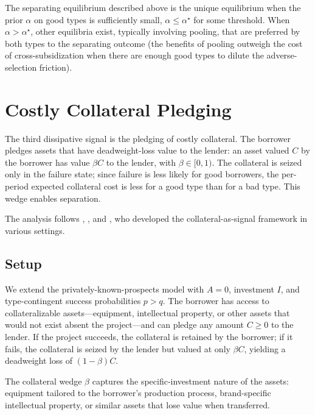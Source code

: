 \documentclass[11pt,a4paper,oneside]{book}
\def\leq{\leqslant}
\def\geq{\geqslant}
\theoremstyle{plain}
\theoremstyle{definition}
\theoremstyle{remark}
\numberwithin{equation}{chapter}
\begin{document}
The separating equilibrium described above is the unique equilibrium when the prior $\alpha$ on good types is sufficiently small, $\alpha \leq \alpha^\star$ for some threshold.
When $\alpha > \alpha^\star$, other equilibria exist, typically involving pooling, that are preferred by both types to the separating outcome (the benefits of pooling outweigh the cost of cross-subsidization when there are enough good types to dilute the adverse-selection friction).

\section{Costly Collateral Pledging}
\label{sec:diss-collateral}

The third dissipative signal is the pledging of costly collateral.
The borrower pledges assets that have deadweight-loss value to the lender: an asset valued $C$ by the borrower has value $\beta C$ to the lender, with $\beta \in [0, 1)$.
The collateral is seized only in the failure state; since failure is less likely for good borrowers, the per-period expected collateral cost is less for a good type than for a bad type.
This wedge enables separation.

The analysis follows \citet{Bester1985, Bester1987}, \citet{BesankoThakor1987}, and \citet{ChanKanatas1985}, who developed the collateral-as-signal framework in various settings.

\subsection{Setup}

We extend the privately-known-prospects model with $A = 0$, investment $I$, and type-contingent success probabilities $p > q$.
The borrower has access to collateralizable assets---equipment, intellectual property, or other assets that would not exist absent the project---and can pledge any amount $C \geq 0$ to the lender.
If the project succeeds, the collateral is retained by the borrower; if it fails, the collateral is seized by the lender but valued at only $\beta C$, yielding a deadweight loss of $(1 - \beta) C$.

The collateral wedge $\beta$ captures the specific-investment nature of the assets: equipment tailored to the borrower's production process, brand-specific intellectual property, or similar assets that lose value when transferred.
\end{document}
